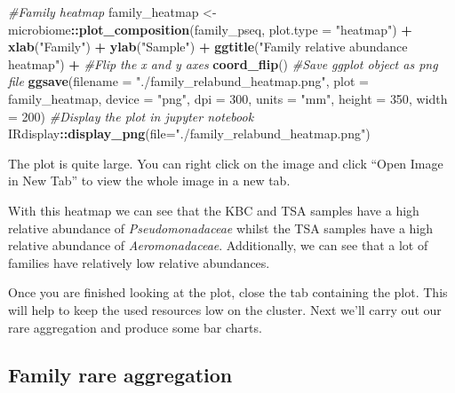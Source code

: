 \documentclass[
]{book}
\newenvironment{Shaded}{\begin{snugshade}}{\end{snugshade}}
\newcommand{\AttributeTok}[1]{\textcolor[rgb]{0.13,0.29,0.53}{#1}}
\newcommand{\CommentTok}[1]{\textcolor[rgb]{0.56,0.35,0.01}{\textit{#1}}}
\newcommand{\DecValTok}[1]{\textcolor[rgb]{0.00,0.00,0.81}{#1}}
\newcommand{\FunctionTok}[1]{\textcolor[rgb]{0.13,0.29,0.53}{\textbf{#1}}}
\newcommand{\NormalTok}[1]{#1}
\newcommand{\OtherTok}[1]{\textcolor[rgb]{0.56,0.35,0.01}{#1}}
\newcommand{\SpecialCharTok}[1]{\textcolor[rgb]{0.81,0.36,0.00}{\textbf{#1}}}
\newcommand{\StringTok}[1]{\textcolor[rgb]{0.31,0.60,0.02}{#1}}
\begin{document}
\begin{Shaded}
\begin{Highlighting}[]
\CommentTok{\#Family heatmap}
\NormalTok{family\_heatmap }\OtherTok{\textless{}{-}}\NormalTok{ microbiome}\SpecialCharTok{::}\FunctionTok{plot\_composition}\NormalTok{(family\_pseq, }\AttributeTok{plot.type =} \StringTok{"heatmap"}\NormalTok{) }\SpecialCharTok{+}
  \FunctionTok{xlab}\NormalTok{(}\StringTok{"Family"}\NormalTok{) }\SpecialCharTok{+} \FunctionTok{ylab}\NormalTok{(}\StringTok{"Sample"}\NormalTok{) }\SpecialCharTok{+}
  \FunctionTok{ggtitle}\NormalTok{(}\StringTok{"Family relative abundance heatmap"}\NormalTok{) }\SpecialCharTok{+}
  \CommentTok{\#Flip the x and y axes}
  \FunctionTok{coord\_flip}\NormalTok{()}
\CommentTok{\#Save ggplot object as png file}
\FunctionTok{ggsave}\NormalTok{(}\AttributeTok{filename =} \StringTok{"./family\_relabund\_heatmap.png"}\NormalTok{, }\AttributeTok{plot =}\NormalTok{ family\_heatmap,}
       \AttributeTok{device =} \StringTok{"png"}\NormalTok{, }\AttributeTok{dpi =} \DecValTok{300}\NormalTok{, }\AttributeTok{units =} \StringTok{"mm"}\NormalTok{, }\AttributeTok{height =} \DecValTok{350}\NormalTok{, }\AttributeTok{width =} \DecValTok{200}\NormalTok{)}
\CommentTok{\#Display the plot in jupyter notebook}
\NormalTok{IRdisplay}\SpecialCharTok{::}\FunctionTok{display\_png}\NormalTok{(}\AttributeTok{file=}\StringTok{"./family\_relabund\_heatmap.png"}\NormalTok{)}
\end{Highlighting}
\end{Shaded}

The plot is quite large.
You can right click on the image and click ``Open Image in New Tab'' to view the whole image in a new tab.

With this heatmap we can see that the KBC and TSA samples have a high relative abundance of \emph{Pseudomonadaceae} whilst the TSA samples have a high relative abundance of \emph{Aeromonadaceae}.
Additionally, we can see that a lot of families have relatively low relative abundances.

Once you are finished looking at the plot, close the tab containing the plot.
This will help to keep the used resources low on the cluster.
Next we'll carry out our rare aggregation and produce some bar charts.

\hypertarget{family-rare-aggregation}{%
\subsection{Family rare aggregation}\label{family-rare-aggregation}}
\end{document}
